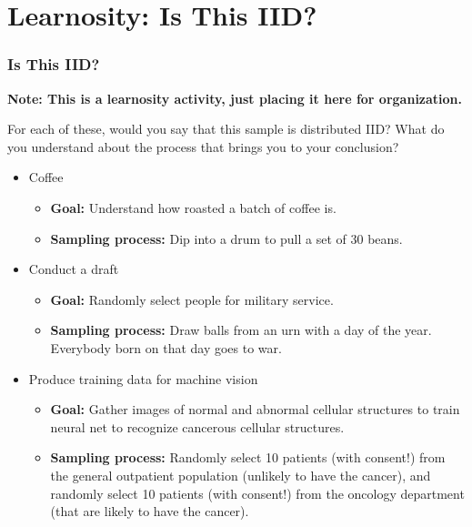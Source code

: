\documentclass[12pt, block=fill]{beamer}
\begin{document}
\section{Learnosity: Is This IID?}

\begin{frame}
  \frametitle{Is This IID? }
    \textbf{Note: This is a learnosity activity, just placing it here
    for organization.}

  For each of these, would you say that this sample is distributed
  IID? What do you understand about the process that brings you to
  your conclusion? 
  \begin{itemize}
  \item Coffee
    \begin{itemize}
    \item \textbf{Goal:} Understand how roasted a batch of coffee is.
    \item \textbf{Sampling process:} Dip into a drum to pull a set of 30 beans. 
    \end{itemize}
  \item Conduct a draft
    \begin{itemize}
    \item \textbf{Goal:} Randomly select people for military service.
    \item \textbf{Sampling process:} Draw balls from an urn with a day
      of the year. Everybody born on that day goes to war. 
    \end{itemize}
      \item Produce training data for machine vision 
    \begin{itemize}
    \item \textbf{Goal:} Gather images of normal and abnormal cellular
      structures to train neural net to recognize cancerous cellular structures.
    \item \textbf{Sampling process:} Randomly select 10 patients (with
      consent!) from the general outpatient population (unlikely to
      have the cancer), and randomly select 10 patients (with
      consent!) from the oncology department (that are likely to have
      the cancer).
    \end{itemize} 
  \end{itemize}
\end{frame}
\end{document}
